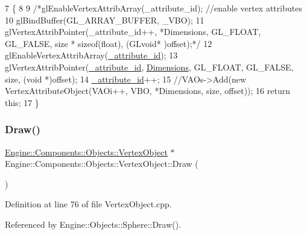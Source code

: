 \begin{DoxyCode}
7 \{
8 
9     \textcolor{comment}{/*glEnableVertexAttribArray(\_attribute\_id); //enable vertex attributes}
10 \textcolor{comment}{    glBindBuffer(GL\_ARRAY\_BUFFER, \_VBO);}
11 \textcolor{comment}{    glVertexAttribPointer(\_attribute\_id++, *Dimensions, GL\_FLOAT, GL\_FALSE, size * sizeof(float), (GLvoid*
      )offset);*/}
12     glEnableVertexAttribArray(\mbox{\hyperlink{classEngine_1_1Components_1_1Objects_1_1VertexObject_a401aa1eb0254e57d8295c2287749eed5}{\_attribute\_id}});
13     glVertexAttribPointer(\mbox{\hyperlink{classEngine_1_1Components_1_1Objects_1_1VertexObject_a401aa1eb0254e57d8295c2287749eed5}{\_attribute\_id}}, \mbox{\hyperlink{classEngine_1_1Components_1_1Objects_1_1VertexObject_ae5bb104a878dc8a3c909ec9b0ee799c1}{Dimensions}}, GL\_FLOAT, GL\_FALSE, size, (\textcolor{keywordtype}{void}
      *)offset);
14     \mbox{\hyperlink{classEngine_1_1Components_1_1Objects_1_1VertexObject_a401aa1eb0254e57d8295c2287749eed5}{\_attribute\_id}}++;
15     \textcolor{comment}{//VAOs->Add(new VertexAttributeObject(VAOi++, VBO, *Dimensions, size, offset));}
16     \textcolor{keywordflow}{return} \textcolor{keyword}{this};
17 \}
\end{DoxyCode}
\mbox{\label{classEngine_1_1Components_1_1Objects_1_1VertexObject_a53a8f546ee082720579e2c33be6cedec}} 
\subsubsection{\texorpdfstring{Draw()}{Draw()}}
{\footnotesize\ttfamily \mbox{\hyperlink{classEngine_1_1Components_1_1Objects_1_1VertexObject}{Engine\+::\+Components\+::\+Objects\+::\+Vertex\+Object}} $\ast$ Engine\+::\+Components\+::\+Objects\+::\+Vertex\+Object\+::\+Draw (\begin{DoxyParamCaption}{ }\end{DoxyParamCaption})\hspace{0.3cm}{\ttfamily [inherited]}}



Definition at line 76 of file Vertex\+Object.\+cpp.



Referenced by Engine\+::\+Objects\+::\+Sphere\+::\+Draw().


